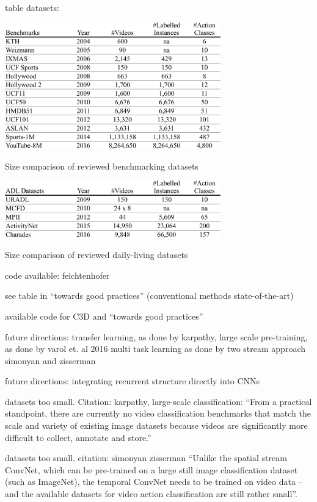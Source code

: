 table datasets:
\begin{table}
    \centering
    \includegraphics[width=0.7\textwidth]{img_evaluation/benchmarks_results}
    \caption{Size comparison of reviewed benchmarking datasets}
    \label{tab:benchmarks_results}
\end{table}

\begin{table}
    \centering
    \includegraphics[width=0.7\textwidth]{img_evaluation/adl_results}
    \caption{Size comparison of reviewed daily-living datasets}
    \label{tab:adl_results}
\end{table}


code available: feichtenhofer

see table in ``towards good practices'' (conventional methods state-of-the-art)

available code for C3D and ``towards good practices''

future directions: transfer learning, as done by karpathy, large scale
pre-training, as done by varol et. al 2016
multi task learning as done by two stream approach simonyan and zisserman

future directions: integrating recurrent structure directly into CNNs 

datasets too small. Citation: karpathy, large-scale classification: ``From a practical standpoint, there are currently no video classification benchmarks that match the scale and variety of existing image datasets because videos are significantly more difficult to collect, annotate and store.''

datasets too small. citation: simonyan zisserman ``Unlike the spatial stream ConvNet, which can be pre-trained on a large still image classification dataset (such as ImageNet), the temporal ConvNet needs to be trained on video data – and the available datasets for video action classification are still rather small''.

